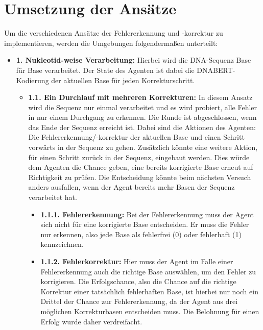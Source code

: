 \documentclass[oneside,bibliography=totocnumbered,BCOR=5mm]{scrbook}%
\theoremstyle{definition}
\theoremstyle{definition}
\theoremstyle{definition}
\theoremstyle{definition}
\theoremstyle{definition}
\theoremstyle{definition}
\begin{document}
\section{Umsetzung der Ansätze}

Um die verschiedenen Ansätze der Fehlererkennung und -korrektur zu implementieren, werden die Umgebungen folgendermaßen unterteilt:

\begin{itemize}

  \item \textbf{1. Nukleotid-weise Verarbeitung:} Hierbei wird die DNA-Sequenz Base für Base verarbeitet. Der State des Agenten ist dabei die DNABERT-Kodierung
  der aktuellen Base für jeden Korrekturschritt. 

  \begin{itemize}

    \item \textbf{1.1. Ein Durchlauf mit mehreren Korrekturen:} In diesem Ansatz wird die Sequenz nur einmal verarbeitet und es wird probiert, alle Fehler 
    in nur einem Durchgang zu erkennen. Die Runde ist abgeschlossen, wenn das Ende der Sequenz erreicht ist.
    Dabei sind die Aktionen des Agenten: Die Fehlererkennung/-korrektur der aktuellen Base und einen Schritt vorwärts in der Sequenz zu gehen.
    Zusätzlich könnte eine weitere Aktion, für einen Schritt zurück in der Sequenz, eingebaut werden. Dies würde dem Agenten die Chance geben,
    eine bereits korrigierte Base erneut auf Richtigkeit zu prüfen. Die Entscheidung könnte beim nächsten Versuch anders ausfallen, 
    wenn der Agent bereits mehr Basen der Sequenz verarbeitet hat.

    \begin{itemize}

      \item \textbf{1.1.1. Fehlererkennung:} Bei der Fehlererkennung muss der Agent sich nicht für eine korrigierte Base entscheiden. Er muss die Fehler 
      nur erkennen, also jede Base als fehlerfrei (0) oder fehlerhaft (1) kennzeichnen.

      \item \textbf{1.1.2. Fehlerkorrektur:} Hier muss der Agent im Falle einer Fehlererkennung auch die richtige Base auswählen, um den Fehler zu korrigieren.
      Die Erfolgschance, also die Chance auf die richtige Korrektur einer tatsächlich fehlerhaften Base, ist hierbei nur noch ein Drittel
      der Chance zur Fehlererkennung, da der Agent aus drei möglichen Korrekturbasen entscheiden muss. Die Belohnung für einen Erfolg
      wurde daher verdreifacht.


\end{itemize}
\end{itemize}
\end{itemize}
\end{document}
